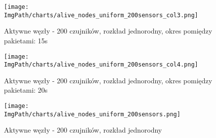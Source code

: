 \begin{figure}[!htbp]
	\begin{center}
		\texttt{[image: \\ImgPath/charts/alive\_nodes\_uniform\_200sensors\_col3.png]}
	\end{center}
	\caption{Aktywne węzły - 200 czujników, rozkład jednorodny, okres pomiędzy pakietami: 15s}
\end{figure}

\begin{figure}[!htbp]
	\begin{center}
		\texttt{[image: \\ImgPath/charts/alive\_nodes\_uniform\_200sensors\_col4.png]}
	\end{center}
	\caption{Aktywne węzły - 200 czujników, rozkład jednorodny, okres pomiędzy pakietami: 20s}
\end{figure}

\begin{figure}[!htbp]
	\begin{center}
		\texttt{[image: \\ImgPath/charts/alive\_nodes\_uniform\_200sensors.png]}
	\end{center}
	\caption{Aktywne węzły - 200 czujników, rozkład jednorodny}
\end{figure}
